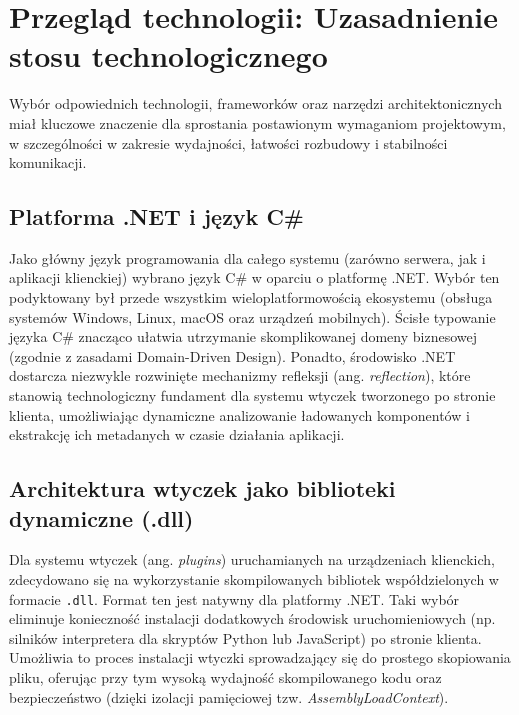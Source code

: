 \section{Przegląd technologii: Uzasadnienie stosu technologicznego}
\label{sec:wybor_stosu}

Wybór odpowiednich technologii, frameworków oraz narzędzi architektonicznych miał kluczowe znaczenie dla sprostania postawionym wymaganiom projektowym, w szczególności w zakresie wydajności, łatwości rozbudowy i stabilności komunikacji.

\subsection{Platforma .NET i język C\#}
\label{subsec:ekosystem_net}
Jako główny język programowania dla całego systemu (zarówno serwera, jak i aplikacji klienckiej) wybrano język C\# w oparciu o platformę .NET. Wybór ten podyktowany był przede wszystkim wieloplatformowością ekosystemu (obsługa systemów Windows, Linux, macOS oraz urządzeń mobilnych). Ścisłe typowanie języka C\# znacząco ułatwia utrzymanie skomplikowanej domeny biznesowej (zgodnie z zasadami Domain-Driven Design). Ponadto, środowisko .NET dostarcza niezwykle rozwinięte mechanizmy refleksji (ang. \textit{reflection}), które stanowią technologiczny fundament dla systemu wtyczek tworzonego po stronie klienta, umożliwiając dynamiczne analizowanie ładowanych komponentów i ekstrakcję ich metadanych w czasie działania aplikacji.

\subsection{Architektura wtyczek jako biblioteki dynamiczne (.dll)}
\label{subsec:systematyka_dll}
Dla systemu wtyczek (ang. \textit{plugins}) uruchamianych na urządzeniach klienckich, zdecydowano się na wykorzystanie skompilowanych bibliotek współdzielonych w formacie \texttt{.dll}. Format ten jest natywny dla platformy .NET. Taki wybór eliminuje konieczność instalacji dodatkowych środowisk uruchomieniowych (np. silników interpretera dla skryptów Python lub JavaScript) po stronie klienta. Umożliwia to proces instalacji wtyczki sprowadzający się do prostego skopiowania pliku, oferując przy tym wysoką wydajność skompilowanego kodu oraz bezpieczeństwo (dzięki izolacji pamięciowej tzw. \textit{AssemblyLoadContext}).

